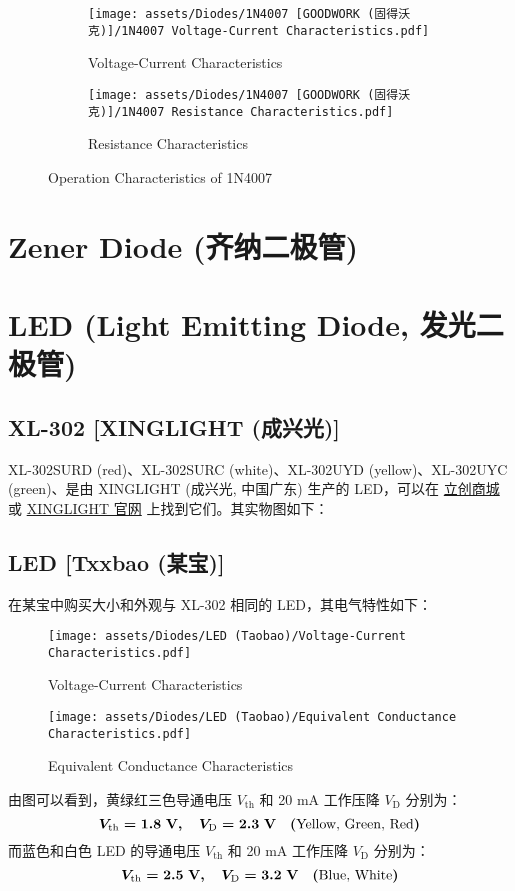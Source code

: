 \documentclass[UTF8]{report}
\begin{document}
\begin{figure}[H]\centering
\begin{subfigure}[b]{0.5\columnwidth}\centering
    \texttt{[image: assets/Diodes/1N4007 [GOODWORK (固得沃克)]/1N4007 Voltage-Current Characteristics.pdf]}
    \caption{Voltage-Current Characteristics}
\end{subfigure}\hfill
\begin{subfigure}[b]{0.5\columnwidth}\centering
    \texttt{[image: assets/Diodes/1N4007 [GOODWORK (固得沃克)]/1N4007 Resistance Characteristics.pdf]}
    \caption{Resistance Characteristics}
\end{subfigure}
\caption{Operation Characteristics of 1N4007}
\label{Operation Characteristics of 1N4007}
\end{figure}





\section{Zener Diode (齐纳二极管)}
\section{LED (Light Emitting Diode, 发光二极管)}
\subsection{XL-302 [XINGLIGHT (成兴光)]}
XL-302SURD (red)、XL-302SURC (white)、XL-302UYD (yellow)、XL-302UYC (green)、是由 XINGLIGHT (成兴光, 中国广东) 生产的 LED，可以在 \href{https://so.szlcsc.com/global.html?k=XL-302U}{立创商城} 或 \href{http://www.xinglight.cn/index.php?s=cpzx&c=search&keyword=XL-302}{XINGLIGHT 官网} 上找到它们。其实物图如下：

\subsection{LED [Txxbao (某宝)]}
在某宝中购买大小和外观与 XL-302 相同的 LED，其电气特性如下：
\begin{figure}[H]\centering
    \texttt{[image: assets/Diodes/LED (Taobao)/Voltage-Current Characteristics.pdf]}
    \caption{Voltage-Current Characteristics}
\end{figure}
\begin{figure}[H]\centering
    \texttt{[image: assets/Diodes/LED (Taobao)/Equivalent Conductance Characteristics.pdf]}
    \caption{Equivalent Conductance Characteristics}
\end{figure}
由图可以看到，黄绿红三色导通电压 $V_\text{th}$ 和 20 mA 工作压降 $V_\text{D}$ 分别为：
\begin{equation}
\boldmath
V_\text{th} = 1.8 \ \mathrm{V},\quad V_\text{D} = 2.3 \ \mathrm{V} \quad (\text{Yellow, Green, Red})
\end{equation}
而蓝色和白色 LED 的导通电压 $V_\text{th}$ 和 20 mA 工作压降 $V_\text{D}$ 分别为：
\begin{equation}
\boldmath
V_\text{th} = 2.5 \ \mathrm{V},\quad V_\text{D} = 3.2 \ \mathrm{V} \quad (\text{Blue, White})
\end{equation}
\end{document}
